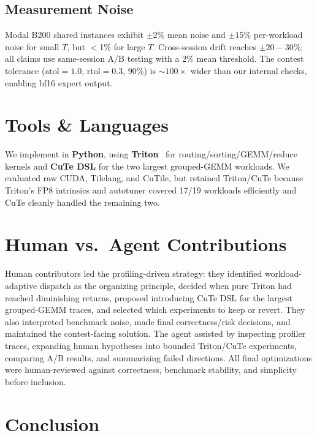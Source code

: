\documentclass[11pt,twocolumn]{article}
\begin{document}
\subsection{Measurement Noise}

Modal B200 shared instances exhibit ${\pm}2\%$ mean noise and ${\pm}15\%$ per-workload noise for small $T$, but $<$1\% for large $T$.
Cross-session drift reaches ${\pm}20{-}30\%$; all claims use same-session A/B testing with a 2\% mean threshold.
The contest tolerance ($\text{atol}{=}1.0$, $\text{rtol}{=}0.3$, 90\%) is ${\sim}100\times$ wider than our internal checks, enabling bf16 expert output.

\section{Tools \& Languages}

We implement in \textbf{Python}, using \textbf{Triton}~\cite{triton} for routing/sorting/GEMM/reduce kernels and \textbf{CuTe DSL} for the two largest grouped-GEMM workloads.
We evaluated raw CUDA, Tilelang, and CuTile, but retained Triton/CuTe because Triton's FP8 intrinsics and autotuner covered 17/19 workloads efficiently and CuTe cleanly handled the remaining two.

\section{Human vs.\ Agent Contributions}

Human contributors led the profiling-driven strategy: they identified workload-adaptive dispatch as the organizing principle, decided when pure Triton had reached diminishing returns, proposed introducing CuTe DSL for the largest grouped-GEMM traces, and selected which experiments to keep or revert.
They also interpreted benchmark noise, made final correctness/risk decisions, and maintained the contest-facing solution.
The agent assisted by inspecting profiler traces, expanding human hypotheses into bounded Triton/CuTe experiments, comparing A/B results, and summarizing failed directions.
All final optimizations were human-reviewed against correctness, benchmark stability, and simplicity before inclusion.

\section{Conclusion}
\end{document}
